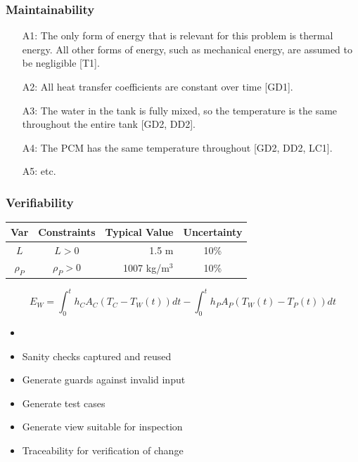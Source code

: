 \documentclass[t,12pt,numbers,fleqn]{beamer}
\begin{document}
\begin{frame}

\frametitle{Maintainability}

\begin{itemize}

\item[A1:] The
  only form of energy that is relevant for this problem is thermal energy.  All
  other forms of energy, such as mechanical energy, are assumed to be
  negligible [T1].

\item[A2:] All heat transfer coefficients are constant over time [GD1].

\item[A3:] The water in
  the tank is fully mixed, so the temperature is the same throughout the entire
  tank [GD2, DD2].

\item[A4:] The PCM has the same temperature throughout [GD2, DD2, LC1].

\item[A5:] etc.

\end{itemize}

\end{frame}


\begin{frame}

\frametitle{Verifiability}

\begin{table} 
\centering
\begin{tabular}{c c r c } 
\toprule
\textbf{Var} & \textbf{Constraints} & \textbf{Typical Value} & \textbf{Uncertainty}\\ \midrule
$L$ & $L > 0$ & 1.5 m & 10\% \\ 
$\rho_P$ & $\rho_P > 0$	& 1007 kg/m$^3$	& 10\% \\
\bottomrule
\end{tabular}
\label{tab:pcm}
\end{table}

\begin{equation*}
E_W = \int_{0}^{t} h_C A_C (T_C - T_W(t)) dt - \int_{0}^{t} h_P A_P (T_W(t) - T_P(t)) dt
\end{equation*}

\begin{itemize}
\item {}
\item Sanity checks captured and reused
\item Generate guards against invalid input
\item Generate test cases
\item Generate view suitable for inspection
\item Traceability for verification of change
\end{itemize}
\end{frame}
\end{document}
